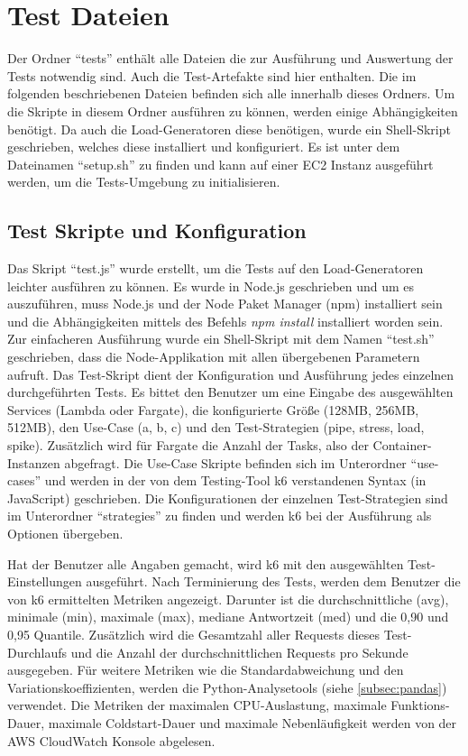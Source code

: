 \section{Test Dateien}
Der Ordner "`tests"' enthält alle Dateien die zur Ausführung und Auswertung der Tests notwendig sind. Auch die Test-Artefakte sind hier enthalten. Die im folgenden beschriebenen Dateien befinden sich alle innerhalb dieses Ordners. Um die Skripte in diesem Ordner ausführen zu können, werden einige Abhängigkeiten benötigt. Da auch die Load-Generatoren diese benötigen, wurde ein Shell-Skript geschrieben, welches diese installiert und konfiguriert. Es ist unter dem Dateinamen "`setup.sh"' zu finden und kann auf einer \ac{EC2} Instanz ausgeführt werden, um die Tests-Umgebung zu initialisieren.

\subsection{Test Skripte und Konfiguration}
Das Skript "`test.js"' wurde erstellt, um die Tests auf den Load-Generatoren leichter ausführen zu können. Es wurde in Node.js geschrieben und um es auszuführen, muss Node.js und der Node Paket Manager (npm) installiert sein und die Abhängigkeiten mittels des Befehls \textit{npm install} installiert worden sein. Zur einfacheren Ausführung wurde ein Shell-Skript mit dem Namen "`test.sh"' geschrieben, dass die Node-Applikation mit allen übergebenen Parametern aufruft. 
Das Test-Skript dient der Konfiguration und Ausführung jedes einzelnen durchgeführten Tests. Es bittet den Benutzer um eine Eingabe des ausgewählten Services (Lambda oder Fargate), die konfigurierte Größe (128MB, 256MB, 512MB), den Use-Case (a, b, c) und den Test-Strategien (pipe, stress, load, spike). Zusätzlich wird für Fargate die Anzahl der Tasks, also der Container-Instanzen abgefragt. Die Use-Case Skripte befinden sich im Unterordner "`use-cases"' und werden in der von dem Testing-Tool k6 verstandenen Syntax (in JavaScript) geschrieben. Die Konfigurationen der einzelnen Test-Strategien sind im Unterordner "`strategies"' zu finden und werden k6 bei der Ausführung als Optionen übergeben.

Hat der Benutzer alle Angaben gemacht, wird k6 mit den ausgewählten Test-Einstellungen ausgeführt. Nach Terminierung des Tests, werden dem Benutzer die von k6 ermittelten Metriken angezeigt. Darunter ist die durchschnittliche (avg), minimale (min), maximale (max), mediane Antwortzeit (med) und die 0,90 und 0,95 Quantile. Zusätzlich wird die Gesamtzahl aller Requests dieses Test-Durchlaufs und die Anzahl der durchschnittlichen Requests pro Sekunde ausgegeben. Für weitere Metriken wie die Standardabweichung und den Variationskoeffizienten, werden die Python-Analysetools (siehe \ref{subsec:pandas}) verwendet. Die Metriken der maximalen CPU-Auslastung, maximale Funktions-Dauer, maximale Coldstart-Dauer und maximale Nebenläufigkeit werden von der \ac{AWS} CloudWatch Konsole abgelesen.

